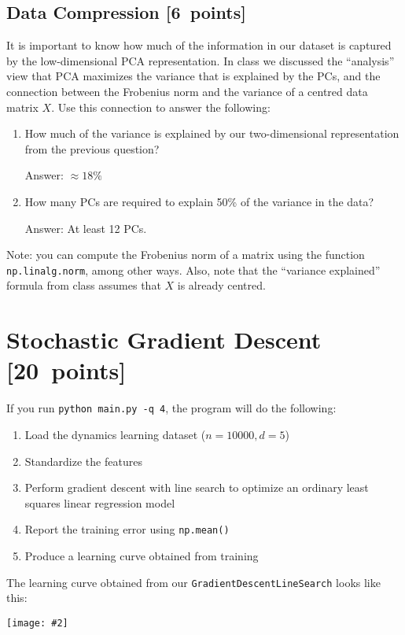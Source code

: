 \documentclass{article}
\newcommand{\blu}[1]{{\textcolor{blu}{#1}}}
\newenvironment{answer}{\par\begingroup\color{gre}Answer: }{\endgroup}
\let\ask\blu
\newcommand\pts[1]{\textcolor{pointscolour}{[#1~points]}}
\newcommand{\centerfig}[2]{\begin{center}\texttt{[image: \#2]}\end{center}}
\begin{document}
\subsection{Data Compression \pts{6}}

It is important to know how much of the information in our dataset is captured by the low-dimensional PCA representation.
In class we discussed the ``analysis'' view that PCA maximizes the variance that is explained by the PCs, and the connection between the Frobenius norm and the variance of a centred data matrix $X$.
Use this connection to answer the following:
\begin{enumerate}
    \item \ask{How much of the variance is explained by our two-dimensional representation from the previous question?}
    \begin{answer}
        $\approx 18\%$
    \end{answer}
    \item \ask{How many PCs are required to explain 50\% of the variance in the data?}
    \begin{answer}
        At least 12 PCs.
    \end{answer}
\end{enumerate}
Note: you can compute the Frobenius norm of a matrix using the function \texttt{np.linalg.norm}, among other ways. Also, note that the ``variance explained'' formula from class assumes that $X$ is already centred.


\clearpage
\section{Stochastic Gradient Descent \pts{20}}

If you run \verb|python main.py -q 4|, the program will do the following:
\begin{enumerate}
    \item Load the dynamics learning dataset ($n = 10000, d = 5$)
    \item Standardize the features
    \item Perform gradient descent with line search to optimize an ordinary least squares linear regression model
    \item Report the training error using \texttt{np.mean()}
    \item Produce a learning curve obtained from training
\end{enumerate}

The learning curve obtained from our \texttt{GradientDescentLineSearch} looks like this:
\centerfig{.6}{./figs/gd_line_search_curve.png}
\end{document}
